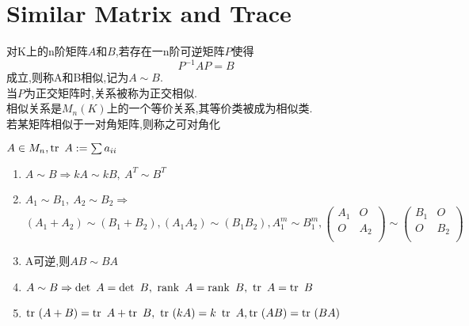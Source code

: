 \documentclass[UTF8,a4paper,notitlepage]{book}
\begin{document}
        \section{Similar Matrix and Trace}
        \begin{definition}[相似矩阵和可对角化]\mbox{}
            对K上的n阶矩阵$A$和$B$,若存在一n阶可逆矩阵$P$使得$$P^{-1}AP=B$$成立,则称A和B相似,记为$A\sim B$.\\ 
            当$P$为正交矩阵时,关系被称为正交相似.\\
            相似关系是$M_n(K)$上的一个等价关系,其等价类被成为相似类.\\
            若某矩阵相似于一对角矩阵,则称之可对角化
        \end{definition}
        \begin{definition}[迹]
            $A\in M_n,\operatorname{tr}~A:=\sum a_{ii}$
        \end{definition}
        \begin{property}[相似矩阵和迹的基本性质]\begin{enumerate}\mbox{}
            \item $A\sim B\Rightarrow kA\sim kB,~A^T\sim B^T$
            \item $A_1\sim B_1,~A_2\sim B_2\Rightarrow $ \\ $(A_1+A_2)\sim(B_1+B_2), (A_1A_2)\sim(B_1B_2), A^m_1\sim B^m_1,\begin{pmatrix}A_1&O\\ O&A_2\\\end{pmatrix}\sim \begin{pmatrix}B_1&O\\ O&B_2\\\end{pmatrix}$
            \item A可逆,则$AB\sim BA$
            \item $A\sim B\Rightarrow \det~A=\det~B,~\operatorname{rank}~A=\operatorname{rank}~B,~\operatorname{tr}~A=\operatorname{tr}~B$
            \item $\operatorname{tr}~(A+B)=\operatorname{tr}~A+\operatorname{tr}~B,~\operatorname{tr}~(kA)=k~\operatorname{tr}~A,\operatorname{tr}~(AB)=\operatorname{tr}~(BA)$
        \end{enumerate}\end{property}
\end{document}
